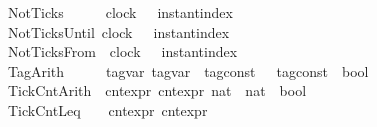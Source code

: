 \begin{isabellebody}
{\isacharbar}\ NotTicks\ \ \ \ \ \ {\isacartoucheopen}clock{\isacartoucheclose}\ \ \ {\isacartoucheopen}instant{\isacharunderscore}index{\isacartoucheclose}\ \ \ \ \ \ \ \ \ \ \ \ \ \ \ \ \ \ \ \ \ \ \ \ {\isacharparenleft}{\isachardoublequoteopen}{\isacharunderscore}\ {\isasymnot}{\isasymUp}\ {\isacharunderscore}{\isachardoublequoteclose}{\isacharparenright}\isanewline
{\isacharbar}\ NotTicksUntil\ {\isacartoucheopen}clock{\isacartoucheclose}\ \ \ {\isacartoucheopen}instant{\isacharunderscore}index{\isacartoucheclose}\ \ \ \ \ \ \ \ \ \ \ \ \ \ \ \ \ \ \ \ \ \ \ \ {\isacharparenleft}{\isachardoublequoteopen}{\isacharunderscore}\ {\isasymnot}{\isasymUp}\ {\isacharless}\ {\isacharunderscore}{\isachardoublequoteclose}{\isacharparenright}\isanewline
{\isacharbar}\ NotTicksFrom\ \ {\isacartoucheopen}clock{\isacartoucheclose}\ \ \ {\isacartoucheopen}instant{\isacharunderscore}index{\isacartoucheclose}\ \ \ \ \ \ \ \ \ \ \ \ \ \ \ \ \ \ \ \ \ \ \ \ {\isacharparenleft}{\isachardoublequoteopen}{\isacharunderscore}\ {\isasymnot}{\isasymUp}\ {\isasymge}\ {\isacharunderscore}{\isachardoublequoteclose}{\isacharparenright}\isanewline
{\isacharbar}\ TagArith\ \ \ \ \ \ {\isacartoucheopen}tag{\isacharunderscore}var{\isacartoucheclose}\ {\isacartoucheopen}tag{\isacharunderscore}var{\isacartoucheclose}\ {\isacartoucheopen}{\isacharparenleft}{\isacharprime}{\isasymtau}\ tag{\isacharunderscore}const\ {\isasymtimes}\ {\isacharprime}{\isasymtau}\ tag{\isacharunderscore}const{\isacharparenright}\ {\isasymRightarrow}\ bool{\isacartoucheclose}\ {\isacharparenleft}{\isachardoublequoteopen}{\isasymlfloor}{\isacharunderscore}{\isacharcomma}\ {\isacharunderscore}{\isasymrfloor}\ {\isasymin}\ {\isacharunderscore}{\isachardoublequoteclose}{\isacharparenright}\isanewline
{\isacharbar}\ TickCntArith\ \ {\isacartoucheopen}cnt{\isacharunderscore}expr{\isacartoucheclose}\ {\isacartoucheopen}cnt{\isacharunderscore}expr{\isacartoucheclose}\ {\isacartoucheopen}{\isacharparenleft}nat\ {\isasymtimes}\ nat{\isacharparenright}\ {\isasymRightarrow}\ bool{\isacartoucheclose}\ \ \ \ \ \ {\isacharparenleft}{\isachardoublequoteopen}{\isasymlceil}{\isacharunderscore}{\isacharcomma}\ {\isacharunderscore}{\isasymrceil}\ {\isasymin}\ {\isacharunderscore}{\isachardoublequoteclose}{\isacharparenright}\isanewline
{\isacharbar}\ TickCntLeq\ \ \ \ {\isacartoucheopen}cnt{\isacharunderscore}expr{\isacartoucheclose}\ {\isacartoucheopen}cnt{\isacharunderscore}expr{\isacartoucheclose}\ \ \ \ \ \ \ \ \ \ \ \ \ \ \ \ \ \ \ \ \ \ \ \ \ \ \ \ {\isacharparenleft}{\isachardoublequoteopen}{\isacharunderscore}\ {\isasympreceq}\ {\isacharunderscore}{\isachardoublequoteclose}{\isacharparenright}\isanewline

\end{isabellebody}
